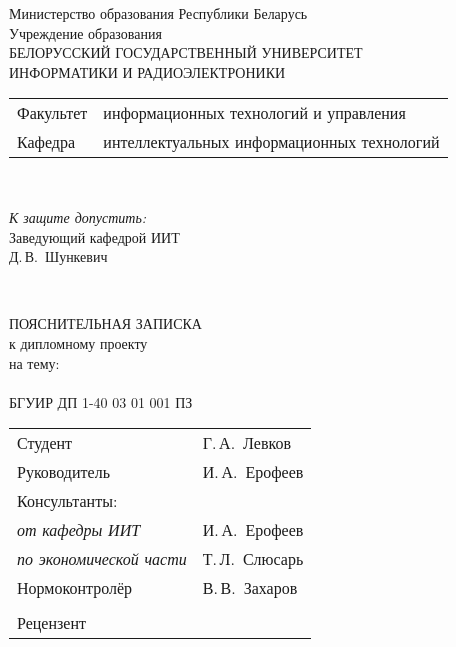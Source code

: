 \begin{titlepage}
  \begin{center}
    Министерство образования Республики Беларусь\\[1em]
    Учреждение образования\\
    БЕЛОРУССКИЙ ГОСУДАРСТВЕННЫЙ УНИВЕРСИТЕТ \\
    ИНФОРМАТИКИ И РАДИОЭЛЕКТРОНИКИ\\[1em]

    \begin{minipage}{\textwidth}
      \begin{flushleft}
        \begin{tabular}{ l l }
          Факультет & информационных технологий и управления\\
          Кафедра   & интеллектуальных информационных технологий
        \end{tabular}
      \end{flushleft}
    \end{minipage}\\[1em]

    \begin{flushright}
      \begin{minipage}{0.4\textwidth}
        \textit{К защите допустить:}\\[0.8em]
        Заведующий кафедрой ИИТ\\[0.45em]
        \underline{\hspace*{2.8cm}} Д.\,В.~Шункевич
      \end{minipage}\\[2.2em]
    \end{flushright}

    {ПОЯСНИТЕЛЬНАЯ ЗАПИСКА}\\
    {к дипломному проекту}\\
    {на тему:}\\[1em]
    \textbf{\large \MakeUppercase{\topicName}}\\[1em]


    {БГУИР ДП 1-40 03 01 001 ПЗ}\\[2em]
    
    \begin{tabular}{ p{}p{} }
      Студент & Г.\,А.~Левков \\
      Руководитель & И.\,А.~Ерофеев \\
      Консультанты: &\\
      \hspace*{3ex}\emph{от кафедры ИИТ} & И.\,А.~Ерофеев \\
      \hspace*{3ex}\emph{по экономической части} & Т.\,Л.~Слюсарь \\
      Нормоконтролёр & В.\,В.~Захаров\\
      & \\
      Рецензент &
    \end{tabular}
    

\end{center}
\end{titlepage}
